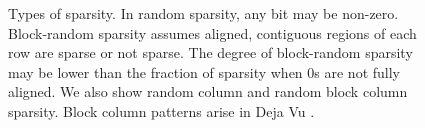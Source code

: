 \documentclass{article}
\begin{document}
\begin{figure}[htbp]
    \centering
    \vspace{1em}
    \caption{Types of sparsity. In random sparsity, any bit may be non-zero. Block-random sparsity assumes aligned, contiguous regions of each row are sparse or not sparse. The degree of block-random sparsity may be lower than the fraction of sparsity when 0s are not fully aligned. We also show random column and random block column sparsity. Block column patterns arise in Deja Vu \cite{liu2023deja}.}
    \label{fig:sparsity_types}
\end{figure}
\end{document}
